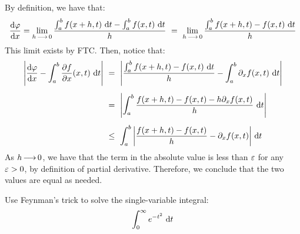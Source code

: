 \begin{soln}
    By definition, we have that:
    \begin{equation*}
        \frac{\textrm{d}\!\operatorname{\varphi}}{\textrm{d} x} = \lim_{h\operatorname{\longrightarrow}0}\frac{\int_{a}^{b}f(x+h,t)\textrm{ d} t
        - \int_{a}^{b}f(x,t)\textrm{ d} t}{h} \ = \
        \lim_{h\operatorname{\longrightarrow}0} \frac{\int_{a}^{b}f(x+h,t)-f(x,t)\textrm{ d} t}{h}
    \end{equation*}
    This limit exists by FTC. Then, notice that:
    \begin{align*}
        \abs{\frac{\d\!\vphi}{\d x} - \int_{a}^{b}\frac{\p f}{\p x}(x, t)\di t}
        \ & = \ \abs{\frac{\int_{a}^{b}f(x+h,t)-f(x,t)\di t}{h} - \int_{a}^{b}
            \p_{x} f(x,t)\di t} \vsp
        & = \ \abs{\int_{a}^{b}\frac{f(x+h,t)-f(x,t)-h\p_{x}f(x,t)}{h}\di t}
        \vsp
        & \leq \ \int_{a}^{b}\abs{\frac{f(x+h,t)-f(x,t)}{h} - \p_{x}f(x,t)}
        \di t
    \end{align*}
    As $ h \operatorname{\longrightarrow} 0 $, we have that the term in the absolute value is less than
    $ \operatorname{\varepsilon} $ for any $ \operatorname{\varepsilon} > 0 $, by definition of partial derivative. Therefore,
    we conclude that the two values are equal as needed.
\end{soln}

\newpage
\begin{qu}[num=27.3]
    Use Feynman's trick to solve the single-variable integral:
    \begin{equation*}
        \int_{0}^{\infty} e^{-t^{2}} \textrm{ d} t
    \end{equation*}
\end{qu}


